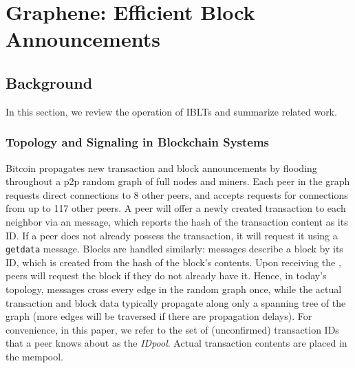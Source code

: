 \chapter{Graphene: Efficient Block Announcements}
\label{graphene}

\section{Background}
In this section, we review the operation of IBLTs and summarize related work.

\subsection{Topology and Signaling in Blockchain Systems} 
Bitcoin propagates new transaction and
block announcements by flooding throughout a p2p random graph of full
nodes and miners. Each peer in the graph requests direct connections
to 8 other peers, and accepts requests for connections from up to 117
other peers. A peer will offer a newly created transaction to each
neighbor via an \inv message, which reports the hash of the
transaction content as its ID. If a peer does not already possess the
transaction, it will request it using a {\tt getdata} message. Blocks
are handled similarly: \inv messages describe a block by its ID, which
is created from the hash of the block's contents.  Upon receiving the
\inv, peers will request the block if they do not already have it.
Hence, in today's topology, \inv messages cross every edge in the
random graph once, while the actual transaction and block data
typically propagate along only a spanning tree of the graph (more
edges will be traversed if there are propagation delays).  For
convenience, in this paper, we refer to the set of (unconfirmed)
transaction IDs that a peer knows about as the {\em IDpool}. Actual
transaction contents are placed in the mempool.

